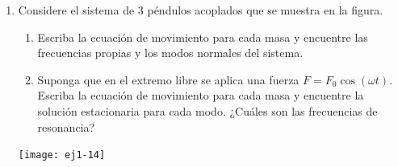 \documentclass[11pt,spanish,a4paper]{article}
\begin{document}
\begin{enumerate}
\item
\begin{minipage}[t][3.5cm]{0.7\textwidth}
Considere el sistema de 3 péndulos acoplados que se muestra en la figura.
\begin{enumerate}
	\item Escriba la ecuación de movimiento para cada masa y encuentre las frecuencias
	propias y los modos normales del sistema. 
	\item Suponga que en el extremo libre se aplica una fuerza $F= F_0 \cos(\omega t)$.
	Escriba la ecuación de movimiento para cada masa y encuentre la solución estacionaria para cada modo.
	¿Cuáles son las frecuencias de resonancia?
\end{enumerate}
\end{minipage}
\begin{minipage}[c][0cm][t]{0.25\textwidth}
  \texttt{[image: ej1-14]}
\end{minipage}



\end{enumerate}
\end{document}
